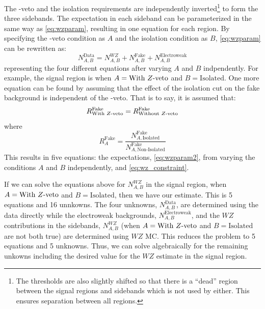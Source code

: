 The \z-veto and the isolation requirements are 
independently inverted\footnote{The thresholds are also slightly shifted 
so that there is a ``dead'' region between the signal regions and sidebands 
which is not used by either. This ensures separation between all regions.}
to form the three sidebands.
The expectation in each sideband can be parameterized
in the same way as \eqn\eqref{eq:wzparam}, resulting in one
equation for each region. By specifying the \z-veto condition
as $A$ and the isolation condition as $B$, \eqn\eqref{eq:wzparam}
can be rewritten as:
\begin{equation}
\label{eq:wzparam2}
N^{\textrm{Data}}_{A,B} =  N^{WZ}_{A,B} + N^{\textrm{Fake}}_{A,B} + N^{\textrm{Electroweak}}_{A,B}
\end{equation}
representing the four different equations after varying $A$ and $B$ indpendently.
For example, the signal region is when $A=\textrm{With \ensuremath{Z}-veto}$ and
$B=\textrm{Isolated}$.
One more equation can be found by assuming that the effect of 
the isolation cut on the fake background is independent of the \z-veto.
That is to say, it is assumed that:
\begin{equation}
\label{eq:wz_constraint}
R^{\textrm{Fake}}_{\textrm{With \ensuremath{Z}-veto}} = R^{\textrm{Fake}}_{\textrm{Without \ensuremath{Z}-veto}}
\end{equation}
where 
\begin{equation}
R^{\textrm{Fake}}_{A} = 
\frac{N^{\textrm{Fake}}_{A,\textrm{Isolated}}}
{N^{\textrm{Fake}}_{A,\textrm{Non-Isolated}}}
\end{equation}
This results in five equations: the expectations,
\eqn\eqref{eq:wzparam2}, from varying the conditions $A$ and $B$ independently,
and \eqn\eqref{eq:wz_constraint}.




If we can solve the equations above for $N^{WZ}_{A,B}$ in the signal region,
when $A=\textrm{With \ensuremath{Z}-veto}$ and $B=\textrm{Isolated}$,
then we have our estimate. 
This is 5 equations and 16 unnkowns. The four unknowns, $N^{\textrm{Data}}_{A,B}$,
are determined using the data directly while 
the electroweak backgrounds, $N^{\textrm{Electroweak}}_{A,B}$,
and the $WZ$ contributions in the sidebands, $N^{WZ}_{A,B}$ 
(when $A=\textrm{With \ensuremath{Z}-veto}$ and $B=\textrm{Isolated}$ are not both true)
are determined using $WZ$ MC. This reduces the problem to 5 equations
and 5 unknowns. Thus, we can solve algebraically for the remaining unkowns
including the desired value for the $WZ$ estimate in the signal region.

